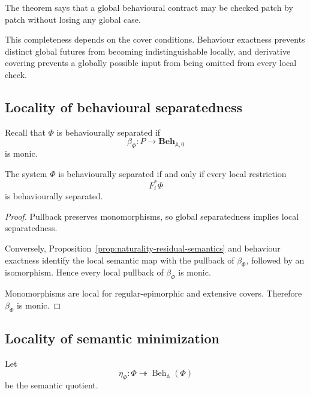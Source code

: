 \begin{remark}
\label{rem:complete-local-verification}
The theorem says that a global behavioural contract may be checked patch by
patch without losing any global case.

This completeness depends on the cover conditions. Behaviour exactness
prevents distinct global futures from becoming indistinguishable locally, and
derivative covering prevents a globally possible input from being omitted
from every local check.
\end{remark}

\subsection{Locality of behavioural separatedness}
\label{subsec:locality-behavioural-separatedness}

Recall that \(\Phi\) is behaviourally separated if
\[
    \beta_\Phi:
    P\to
    \mathbf{Beh}_{\mathbb A,0}
\]
is monic.

\begin{theorem}
\label{thm:separatedness-interface-local}
The system \(\Phi\) is behaviourally separated if and only if every local
restriction
\[
    F_i^\ast\Phi
\]
is behaviourally separated.
\end{theorem}

\begin{proof}
Pullback preserves monomorphisms, so global separatedness implies local
separatedness.

Conversely,
Proposition~\ref{prop:naturality-residual-semantics}
and behaviour exactness identify the local semantic map with the pullback of
\(\beta_\Phi\), followed by an isomorphism. Hence every local pullback of
\(\beta_\Phi\) is monic.

Monomorphisms are local for regular-epimorphic and extensive covers. Therefore
\(\beta_\Phi\) is monic.
\end{proof}

\subsection{Locality of semantic minimization}
\label{subsec:locality-semantic-minimization}

Let
\[
    \eta_\Phi:
    \Phi\twoheadrightarrow
    \operatorname{Beh}_{\mathbb A}(\Phi)
\]
be the semantic quotient.

